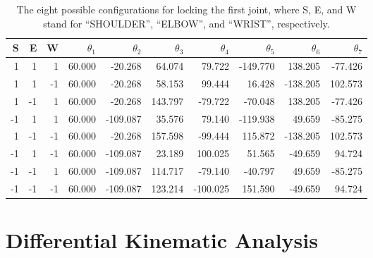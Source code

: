 \documentclass{article}
\begin{document}
\begin{table}[h]
\centering
\begin{tabular}{*{10}{r}}
\toprule
S & E & W & $\theta_1$ & $\theta_2$ & $\theta_3$ & $\theta_4$ & $\theta_5$ & $\theta_6$ & $\theta_7$ \\
\midrule
 1 &  1 &  1 & 60.000 &  -20.268   &  64.074 &   79.722 & -149.770 &  138.205 & -77.426 \\
 1 &  1 & -1 & 60.000 &  -20.268   &  58.153 &   99.444 &   16.428 & -138.205 & 102.573 \\
 1 & -1 &  1 & 60.000 &  -20.268   & 143.797 &  -79.722 &  -70.048 &  138.205 & -77.426 \\
-1 &  1 &  1 & 60.000 & -109.087   &  35.576 &   79.140 & -119.938 &   49.659 & -85.275 \\
 1 & -1 & -1 & 60.000 &  -20.268   & 157.598 &  -99.444 &  115.872 & -138.205 & 102.573 \\
-1 &  1 & -1 & 60.000 & -109.087   &  23.189 &  100.025 &   51.565 &  -49.659 &  94.724 \\
-1 & -1 &  1 & 60.000 & -109.087   & 114.717 &  -79.140 &  -40.797 &   49.659 & -85.275 \\
-1 & -1 & -1 & 60.000 & -109.087   & 123.214 & -100.025 &  151.590 &  -49.659 &  94.724 \\
\bottomrule
\end{tabular}
\caption{The eight possible configurations for locking the first joint, where S, E, and W stand for ``SHOULDER'', ``ELBOW'', and ``WRIST'', respectively.}
\label{ik_res}
\end{table}

\section{Differential Kinematic Analysis}
\end{document}
